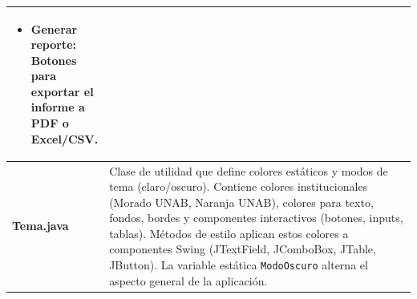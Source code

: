 \documentclass[utf8]{article}
\begin{document}
\begin{longtable}{p{0.15\linewidth}p{0.85\linewidth}}
\begin{itemize}[leftmargin=*, topsep=0pt, itemsep=0.5em]
    \item \textbf{Generar reporte:} Botones para exportar el informe a PDF o Excel/CSV.
\end{itemize} \\ \hline
\textbf{Tema.java} & Clase de utilidad que define colores estáticos y modos de tema (claro/oscuro). Contiene colores institucionales (Morado UNAB, Naranja UNAB), colores para texto, fondos, bordes y componentes interactivos (botones, inputs, tablas). Métodos de estilo aplican estos colores a componentes Swing (JTextField, JComboBox, JTable, JButton). La variable estática \texttt{ModoOscuro} alterna el aspecto general de la aplicación. \\ \hline
\end{longtable}
\end{document}

